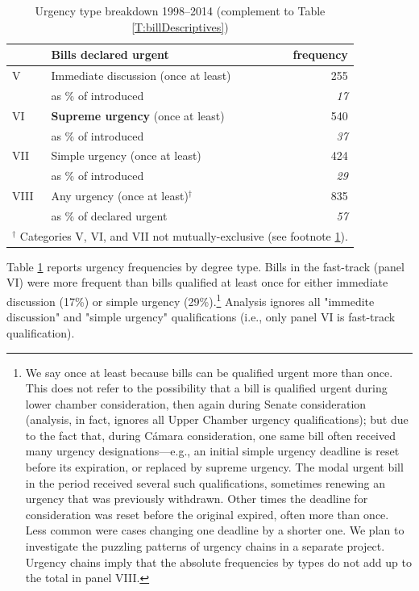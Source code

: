 \documentclass[letter,12pt]{article}
\begin{document}
\begin{table}
\centering
\caption{Urgency type breakdown 1998--2014 (complement to Table \ref{T:billDescriptives})}\label{T:billDescriptivesPartB}
\begin{tabular}{llr}
    & Bills declared urgent                        &  frequency   \\ \hline
V   & Immediate discussion (once at least)         &         255  \\
    & as \% of introduced                          &   \emph{17}  \\ \hdashline
VI  & \textbf{Supreme urgency} (once at least)     &         540  \\
    & as \% of introduced                          &   \emph{37}  \\ \hdashline
VII & Simple urgency (once at least)               &         424  \\
    & as \% of introduced                          &   \emph{29}  \\ \hdashline
VIII& Any urgency (once at least)$^\dagger$          &         835  \\
    & as \% of declared urgent                     &   \emph{57}  \\
\hline
\multicolumn{3}{r}{\footnotesize{$^\dagger$ Categories V, VI, and VII not mutually-exclusive (see footnote \ref{fnNonExclusive}).}} \\
\end{tabular}
\end{table}

Table \ref{T:billDescriptivesPartB} reports urgency frequencies by degree type. Bills in the fast-track (panel VI) were more frequent than bills qualified at least once for either immediate discussion (17\%) or simple urgency (29\%).\footnote{\label{fnNonExclusive}We say once at least because bills can be qualified urgent more than once. This does not refer to the possibility that a bill is qualified urgent during lower chamber consideration, then again during Senate consideration (analysis, in fact, ignores all Upper Chamber urgency qualifications); but due to the fact that, during Cámara consideration, one same bill often received many urgency designations---e.g., an initial simple urgency deadline is reset before its expiration, or replaced by supreme urgency. The modal urgent bill in the period received several such qualifications, sometimes renewing an urgency that was previously withdrawn. Other times the deadline for consideration was reset before the original expired, often more than once. Less common were cases changing one deadline by a shorter one. We plan to investigate the puzzling patterns of urgency chains in a separate project. Urgency chains imply that the absolute frequencies by types do not add up to the total in panel VIII.} Analysis ignores all "immedite discussion" and "simple urgency" qualifications (i.e., only panel VI is fast-track qualification). 
\end{document}
